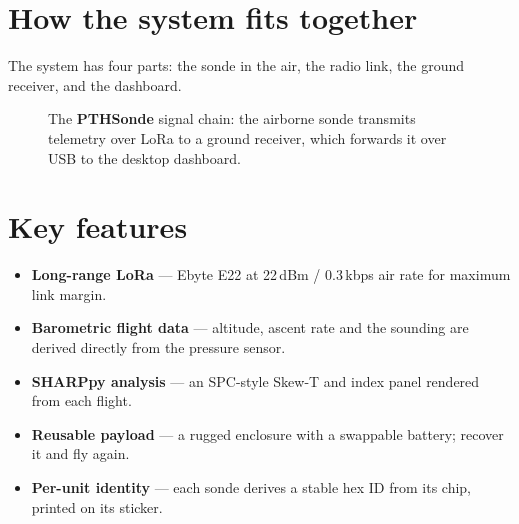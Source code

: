 \documentclass[11pt,openany]{report}
\newcommand{\PTH}{\texorpdfstring{\textbf{PTH}\textcolor{tlorange}{\textbf{Sonde}}}{PTHSonde}}
\begin{document}
\section{How the system fits together}
The system has four parts: the sonde in the air, the radio link, the ground
receiver, and the dashboard.

\begin{figure}[htbp]
\centering
{}
\caption{The \PTH{} signal chain: the airborne sonde transmits telemetry over LoRa to a
ground receiver, which forwards it over USB to the desktop dashboard.}
\end{figure}

\section{Key features}
\begin{itemize}
  \item \textbf{Long-range LoRa} --- Ebyte E22 at 22\,dBm / 0.3\,kbps air rate for maximum link margin.
  \item \textbf{Barometric flight data} --- altitude, ascent rate and the sounding are derived
        directly from the pressure sensor.
  \item \textbf{SHARPpy analysis} --- an SPC-style Skew-T and index panel rendered from each flight.
  \item \textbf{Reusable payload} --- a rugged enclosure with a swappable battery; recover it and fly again.
  \item \textbf{Per-unit identity} --- each sonde derives a stable hex ID from its chip, printed on its sticker.
\end{itemize}
\end{document}
